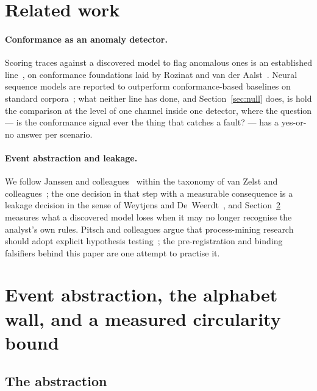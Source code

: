 \documentclass[runningheads]{llncs}
\begin{document}
\section{Related work}
\label{sec:related}

\paragraph{Conformance as an anomaly detector.}
Scoring traces against a discovered model to flag anomalous ones is an established line~\cite{bezerra2013anomalytraces}, on conformance foundations laid by Rozinat and van der Aalst~\cite{rozinat2008conformance,vanderaalst2012replaying}. Neural sequence models are reported to outperform conformance-based baselines on standard corpora~\cite{nolle2022binet}; what neither line has done, and Section~\ref{sec:null} does, is hold the comparison at the level of one channel inside one detector, where the question --- is the conformance signal ever the thing that catches a fault? --- has a yes-or-no answer per scenario.

\paragraph{Event abstraction and leakage.}
We follow Janssen and colleagues~\cite{janssen2021sensoreventlog} within the taxonomy of van Zelst and colleagues~\cite{vanzelst2021eventabstraction}; the one decision in that step with a measurable consequence is a leakage decision in the sense of Weytjens and De~Weerdt~\cite{weytjens2022dataleakage}, and Section~\ref{sec:abstraction} measures what a discovered model loses when it may no longer recognise the analyst's own rules. Pitsch and colleagues argue that process-mining research should adopt explicit hypothesis testing~\cite{pitsch2025hypothesistesting}; the pre-registration and binding falsifiers behind this paper are one attempt to practise it.

\section{Event abstraction, the alphabet wall, and a measured circularity bound}
\label{sec:abstraction}

\subsection{The abstraction}
\end{document}
